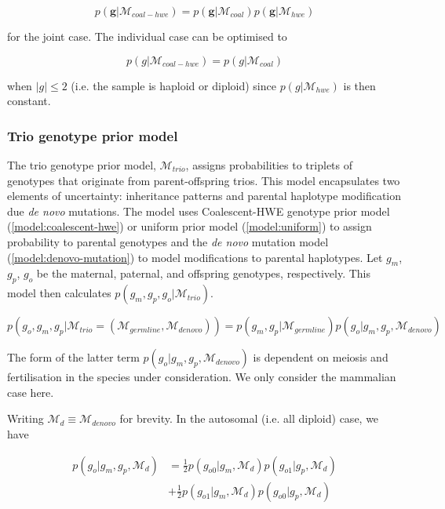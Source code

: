 \documentclass{article}
\begin{document}
\begin{equation}
    p(\boldsymbol{g} | \mathcal{M}_{coal-hwe}) = p(\boldsymbol{g} | \mathcal{M}_{coal}) p(\boldsymbol{g} | \mathcal{M}_{hwe})
\end{equation}

for the joint case. The individual case can be optimised to

\begin{equation}
    p(g | \mathcal{M}_{coal-hwe}) = p(g | \mathcal{M}_{coal})
\end{equation}

when $|g| \le 2$ (i.e. the sample is haploid or diploid) since $p(g | \mathcal{M}_{hwe})$ is then constant.

\subsubsection{Trio genotype prior model}\label{model:trio-prior}

The trio genotype prior model, $\mathcal{M}_{trio}$, assigns probabilities to triplets of genotypes that originate from parent-offspring trios. This model encapsulates two elements of uncertainty: inheritance patterns and parental haplotype modification due \textit{de novo} mutations. The model uses Coalescent-HWE genotype prior model (\ref{model:coalescent-hwe}) or uniform prior model (\ref{model:uniform}) to assign probability to parental genotypes and the \emph{de novo} mutation model (\ref{model:denovo-mutation}) to model modifications to parental haplotypes. Let $g_m$, $g_p$, $g_o$ be the maternal, paternal, and offspring genotypes, respectively. This model then calculates $p(g_m, g_p, g_o | \mathcal{M}_{trio})$.

\begin{equation}
    p(g_o, g_m, g_p | \mathcal{M}_{trio} = (\mathcal{M}_{germline}, \mathcal{M}_{denovo})) = p(g_m, g_p | \mathcal{M}_{germline}) p(g_o | g_m, g_p, \mathcal{M}_{denovo})
\end{equation}

The form of the latter term $p(g_o | g_m, g_p, \mathcal{M}_{denovo})$ is dependent on meiosis and fertilisation in the species under consideration. We only consider the mammalian case here.

Writing $\mathcal{M}_{d} \equiv \mathcal{M}_{denovo}$ for brevity. In the autosomal (i.e. all diploid) case, we have

\begin{align}
    p(g_o | g_m, g_p, \mathcal{M}_{d}) &= \frac{1}{2} p(g_{o0} | g_m, \mathcal{M}_{d})p(g_{o1} | g_p, \mathcal{M}_{d}) \\ &+ \frac{1}{2} p(g_{o1} | g_m, \mathcal{M}_{d}) p(g_{o0} |g_p, \mathcal{M}_{d})
\end{align}
\end{document}
